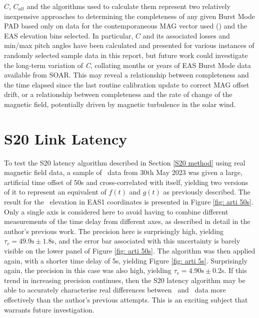 \noindent \(C\), \(C_{alt}\) and the algorithms used to calculate them represent two relatively inexpensive approaches to determining the completeness of any given Burst Mode PAD based only on data for the contemporaneous MAG vector used (\Bmag) and the EAS elevation bins selected. In particular, \(C\) and its associated losses and min/max pitch angles have been calculated and presented for various instances of randomly selected sample data in this report, but future work could investigate the long-term variation of \textit{C}, collating months or years of EAS Burst Mode data available from SOAR. This may reveal a relationship between completeness and the time elapsed since the last routine calibration update to correct MAG offset drift, or a relationship between completeness and the rate of change of the magnetic field, potentially driven by magnetic turbulence in the solar wind\cite{smith2021}. 

\newpage
\section{S20 Link Latency} \label{S20 Link Latency}

To test the S20 latency algorithm described in Section \ref{S20 method} using real magnetic field data, a sample of \Bmag\ data from 30th May 2023 was given a large, artificial time offset of 50s and cross-correlated with itself, yielding two versions of it to represent an equivalent of \(f(t)\) and \(g(t)\) as previously described. The result for the \Bmag\ elevation in EAS1 coordinates is presented in Figure \ref{fig: arti 50s}. Only a single axis is considered here to avoid having to combine different measurements of the time delay from different axes, as described in detail in the author's previous work\cite{dickson2024}. The precision here is surprisingly high, yielding \(\tau_r=49.9\textrm{s}\pm1.8\)s, and the error bar associated with this uncertainty is barely visible on the lower panel of Figure \ref{fig: arti 50s}. The algorithm was then applied again, with a shorter time delay of 5s, yielding Figure \ref{fig: arti 5s}. Surprisingly again, the precision in this case was also high, yielding \(\tau_r=4.90\textrm{s}\pm0.2\)s. If this trend in increasing precision continues, then the S20 latency algorithm may be able to accurately characterise real differences between \Bmag\ and \Beas\ data more effectively than the author's previous attempts\cite{dickson2024}. This is an exciting subject that warrants future investigation.

